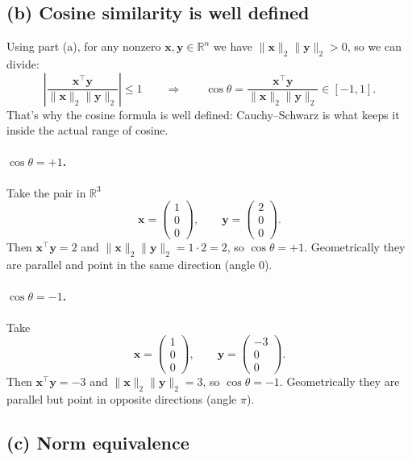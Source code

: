 \documentclass[11pt]{article}
\newcommand{\vct}[1]{\mathbf{#1}}
\begin{document}
\subsection*{(b) Cosine similarity is well defined}

Using part (a), for any nonzero \(\vct{x}, \vct{y} \in \mathbb{R}^n\) we have
\(\|\vct{x}\|_2 \|\vct{y}\|_2 > 0\), so we can divide:
\[
\left| \frac{\vct{x}^\top \vct{y}}{\|\vct{x}\|_2 \|\vct{y}\|_2} \right| \le 1
\qquad \Rightarrow \qquad
\cos\theta
= \frac{\vct{x}^\top \vct{y}}{\|\vct{x}\|_2 \|\vct{y}\|_2}
\in [-1, 1].
\]
That's why the cosine formula is well defined: Cauchy--Schwarz is what keeps
it inside the actual range of cosine.

\paragraph{\(\cos\theta = +1\).}
Take the pair in \(\mathbb{R}^3\)
\[
\vct{x} = \begin{pmatrix} 1 \\ 0 \\ 0 \end{pmatrix},
\qquad
\vct{y} = \begin{pmatrix} 2 \\ 0 \\ 0 \end{pmatrix}.
\]
Then \(\vct{x}^\top \vct{y} = 2\) and
\(\|\vct{x}\|_2 \|\vct{y}\|_2 = 1 \cdot 2 = 2\), so \(\cos\theta = +1\).
Geometrically they are parallel and point in the same direction (angle \(0\)).

\paragraph{\(\cos\theta = -1\).}
Take
\[
\vct{x} = \begin{pmatrix} 1 \\ 0 \\ 0 \end{pmatrix},
\qquad
\vct{y} = \begin{pmatrix} -3 \\ 0 \\ 0 \end{pmatrix}.
\]
Then \(\vct{x}^\top \vct{y} = -3\) and
\(\|\vct{x}\|_2 \|\vct{y}\|_2 = 3\), so \(\cos\theta = -1\).
Geometrically they are parallel but point in opposite directions
(angle \(\pi\)).

\subsection*{(c) Norm equivalence}
\end{document}
